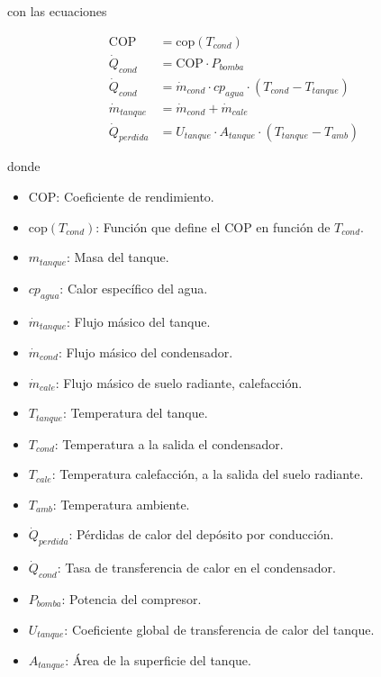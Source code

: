 con las ecuaciones

\begin{align}
	\text{COP}        & = \text{cop}(T_{cond})         \label{eq:cop_t_cond}                               \\
	\dot{Q}_{cond}    & = \text{COP} \cdot P_{bomba}   \label{eq:q_cond_1}                                 \\
	\dot{Q}_{cond}    & = \dot{m}_{cond} \cdot cp_{agua} \cdot (T_{cond} - T_{tanque}) \label{eq:q_cond_2} \\
	\dot{m}_{tanque}  & = \dot{m}_{cond} + \dot{m}_{cale}      \label{eq:m_dot_tanque}                     \\
	\dot{Q}_{perdida} & = U_{tanque} \cdot A_{tanque} \cdot (T_{tanque} - T_{amb})  \label{eq:q_perdida}
\end{align}

donde

\begin{itemize}
	\item $\text{COP}$: Coeficiente de rendimiento.
	\item $\text{cop}(T_{cond})$: Función que define el COP en función de $T_{cond}$.
	\item $m_{tanque}$: Masa del tanque.
	\item $cp_{agua}$: Calor específico del agua.
	\item $\dot{m}_{tanque}$: Flujo másico del tanque.
	\item $\dot{m}_{cond}$: Flujo másico del condensador.
	\item $\dot{m}_{cale}$: Flujo másico de suelo radiante, calefacción.
	\item $T_{tanque}$: Temperatura del tanque.
	\item $T_{cond}$: Temperatura a la salida el condensador.
	\item $T_{cale}$: Temperatura calefacción, a la salida del suelo radiante.
	\item $T_{amb}$: Temperatura ambiente.
	\item $\dot{Q}_{perdida}$: Pérdidas de calor del depósito por conducción.
	\item $\dot{Q}_{cond}$: Tasa de transferencia de calor en el condensador.
	\item $P_{bomba}$: Potencia del compresor.
	\item $U_{tanque}$: Coeficiente global de transferencia de calor del tanque.
	\item $A_{tanque}$: Área de la superficie del tanque.
\end{itemize}


